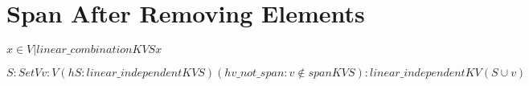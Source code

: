 \section{Span After Removing Elements}

\begin{definition}
  \label{definition : span}
  \leanok
  ${ x \in V | linear\_combination K V S x }$
\end{definition}

\begin{theorem}
  \label{theorem : linear_independent_insert_of_not_in_span}
  \leanok
  ${S : Set V} {v : V}
  (hS : linear\_independent K V S)
  (hv\_not\_span : v \notin span K V S):
  linear\_independent K V (S \cup {v})$
\end{theorem}
